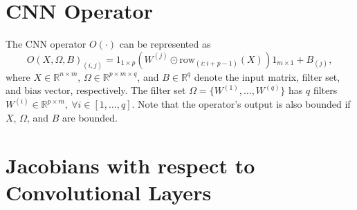 \documentclass{l4dc2025}
\begin{document}
\begin{appendix}

\section{CNN Operator}\label{A. CNN Operator}

The CNN operator $O(\cdot)$ can be represented as 
\begin{equation}
    O(X,\Omega,B)_{(i,j)} = 
    1_{1\times p}
    (
    W^{(j)}\odot \text{row}_{(i:i+p-1)} (X)
    )
    1_{m\times 1}
    + B_{(j)},
\end{equation}
where $X\in\mathbb{R}^{n\times m}$, $\Omega \in\mathbb{R}^{p\times m\times q}$, and $B\in\mathbb{R}^{q}$ denote the input matrix, filter set, and bias vector, respectively.
The filter set $\Omega=\{W^{(1)},\dots,W^{(q)}\}$ has $q$ filters $W^{(i)}\in\mathbb{R}^{p\times m},\ \forall i\in[1,\dots, q]$. 
Note that the operator's output is also bounded if $X$, $\Omega$, and $B$ are bounded.

\section{Jacobians with respect to Convolutional Layers}\label{A. CNN Jacobian}


\end{appendix}
\end{document}
